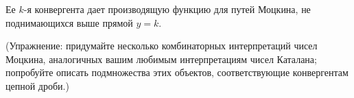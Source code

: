 \documentclass[a4paper, 12pt]{article}
\begin{document}
 Ее $k$-я конвергента дает производящую функцию для путей Моцкина, не поднимающихся выше прямой $y=k$.

\smallskip

\noindent
(Упражнение: придумайте несколько комбинаторных интерпретаций чисел Моцкина, аналогичных вашим любимым интерпретациям чисел Каталана; попробуйте описать подмножества этих объектов, соответствующие конвергентам цепной дроби.)
%











\end{document}
